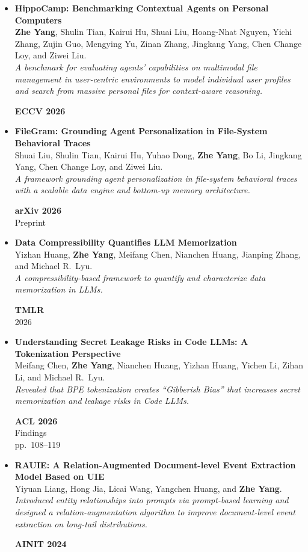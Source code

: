 \documentclass[a4paper,11pt]{article}
\newcommand{\pubentry}[5]{%
  \item \begin{minipage}[t]{0.78\linewidth}
    \textbf{#1} \\[1pt]
    #2 \\[1pt]
    \textit{#3}
  \end{minipage}\hfill
  \begin{minipage}[t]{0.18\linewidth}
    \raggedleft
    \textbf{#4} \\ #5
  \end{minipage}
  \vspace{2pt}
}
\begin{document}
\begin{itemize}[itemsep=6pt]
  \pubentry{HippoCamp: Benchmarking Contextual Agents on Personal Computers}%
    {\textbf{Zhe Yang}, Shulin Tian, Kairui Hu, Shuai Liu, Hoang-Nhat Nguyen, Yichi Zhang, Zujin Guo, Mengying Yu, Zinan Zhang, Jingkang Yang, Chen Change Loy, and Ziwei Liu.}%
    {A benchmark for evaluating agents' capabilities on multimodal file management in user-centric environments to model individual user profiles and search from massive personal files for context-aware reasoning.}%
    {ECCV 2026}{}

  \pubentry{FileGram: Grounding Agent Personalization in File-System Behavioral Traces}%
    {Shuai Liu, Shulin Tian, Kairui Hu, Yuhao Dong, \textbf{Zhe Yang}, Bo Li, Jingkang Yang, Chen Change Loy, and Ziwei Liu.}%
    {A framework grounding agent personalization in file-system behavioral traces with a scalable data engine and bottom-up memory architecture.}%
    {arXiv 2026}{Preprint}

  \pubentry{Data Compressibility Quantifies LLM Memorization}%
    {Yizhan Huang, \textbf{Zhe Yang}, Meifang Chen, Nianchen Huang, Jianping Zhang, and Michael R.\ Lyu.}%
    {A compressibility-based framework to quantify and characterize data memorization in LLMs.}%
    {TMLR}{2026}

  \pubentry{Understanding Secret Leakage Risks in Code LLMs: A Tokenization Perspective}%
    {Meifang Chen, \textbf{Zhe Yang}, Nianchen Huang, Yizhan Huang, Yichen Li, Zihan Li, and Michael R.\ Lyu.}%
    {Revealed that BPE tokenization creates ``Gibberish Bias'' that increases secret memorization and leakage risks in Code LLMs.}%
    {ACL 2026}{Findings \\ pp.\ 108--119}

  \pubentry{RAUIE: A Relation-Augmented Document-level Event Extraction Model Based on UIE}%
    {Yiyuan Liang, Hong Jia, Licai Wang, Yangchen Huang, and \textbf{Zhe Yang}.}%
    {Introduced entity relationships into prompts via prompt-based learning and designed a relation-augmentation algorithm to improve document-level event extraction on long-tail distributions.}%
    {AINIT 2024}{}

\end{itemize}

\end{document}
